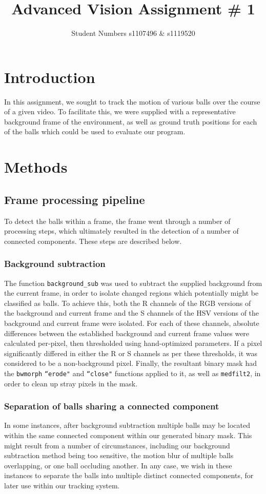 \documentclass[12pt,a4paper]{article}
\begin{document}
\title{Advanced Vision Assignment \# 1}
\author{Student Numbers s1107496 \& s1119520}

\maketitle

\section{Introduction}
In this assignment, we sought to track the motion of various balls over the course of a given video. To facilitate this, we were supplied with a representative background frame of the environment, as well as ground truth positions for each of the balls which could be used to evaluate our program.

\section{Methods}

\subsection{Frame processing pipeline}
To detect the balls within a frame, the frame went through a number of processing steps, which ultimately resulted in the detection of a number of connected components. These steps are described below.
\subsubsection{Background subtraction}
The function \texttt{background\_sub} was used to subtract the supplied background from the current frame, in order to isolate changed regions which potentially might be classified as balls. To achieve this, both the R channels of the RGB versions of the background and current frame and the S channels of the HSV versions of the background and current frame were isolated. For each of these channels, absolute differences between the established background and current frame values were calculated per-pixel, then thresholded using hand-optimized parameters. If a pixel significantly differed in either the R or S channels as per these thresholds, it was considered to be a non-background pixel. Finally, the resultant binary mask had the \texttt{bwmorph} \texttt{``erode"} and \texttt{``close"} functions applied to it, as well as \texttt{medfilt2}, in order to clean up stray pixels in the mask. 
\subsubsection{Separation of balls sharing a connected component}
In some instances, after background subtraction multiple balls may be located within the same connected component within our generated binary mask. This might result from a number of circumstances, including our background subtraction method being too sensitive, the motion blur of multiple balls overlapping, or one ball occluding another. In any case, we wish in these instances to separate the balls into multiple distinct connected components, for later use within our tracking system. 
\end{document}
